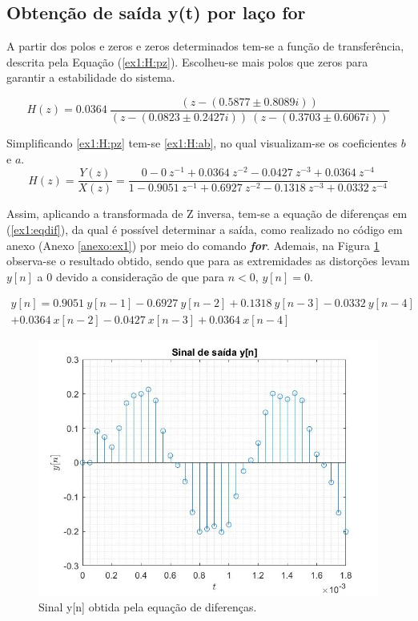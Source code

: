 \documentclass[a4paper,12pt,oneside,openany,table,xcdraw]{article}
\begin{document}
\subsection{Obtenção de saída y(t) por laço for}
A partir dos polos e zeros e zeros determinados tem-se a função de transferência, descrita pela Equação (\ref{ex1:H:pz}). Escolheu-se mais polos que zeros para garantir a estabilidade do sistema.

\begin{equation} \label{ex1:H:pz}
H(z) = 0.0364\  \dfrac{ (z - (0.5877 \pm 0.8089i) )}{(z - (0.0823 \pm 0.2427i))\ (z - (0.3703 \pm 0.6067i))}
\end{equation}
\vspace{0.1cm}

Simplificando \ref{ex1:H:pz} tem-se \ref{ex1:H:ab}, no qual visualizam-se os coeficientes $b$ e $a$.
\begin{equation} \label{ex1:H:ab}
H(z) = \dfrac{Y(z)}{X(z)}=\dfrac{0 - 0\ z^{-1} + 0.0364\ z^{-2} -0.0427\ z^{-3} + 0.0364\ z^{-4}}{1 -0.9051\ z^{-1} +0.6927\ z^{-2} -0.1318\ z^{-3} +0.0332\ z^{-4}}
\end{equation}
\vspace{0.2cm}

Assim, aplicando a transformada de Z inversa, tem-se a equação de diferenças em (\ref{ex1:eqdif}), da qual é possível determinar a saída, como realizado no código em anexo (Anexo \ref{anexo:ex1}) por meio do comando \textbf{\emph{for}}. Ademais, na Figura \ref{ex1:yn} observa-se o resultado obtido, sendo que para as extremidades as distorções levam $y[n]$ a 0 devido a consideração de que para $n<0$, $y[n]=0$.

\begin{multline} \label{ex1:eqdif}
y[n] = 0.9051\ y[n-1] - 0.6927 \ y[n-2]  +0.1318\ y[n-3]  - 0.0332\ y[n-4] \\
+ 0.0364\ x[n-2]   -0.0427\ x[n-3]  +  0.0364\ x[n-4]
\end{multline}

\vspace{0.2cm}
\begin{figure}[H]
\centering
\includegraphics[width=13cm]{ex1_yn}
\caption{Sinal y[n] obtida pela equação de diferenças.}
\label{ex1:yn}
\end{figure}
\end{document}

